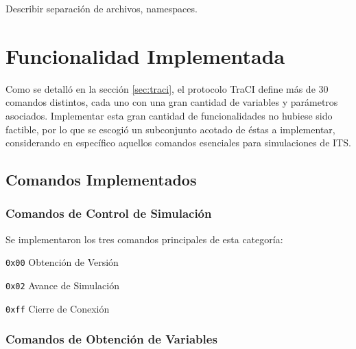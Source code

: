 Describir separación de archivos, namespaces.

\section{Funcionalidad Implementada}

Como se detalló en la sección \ref{sec:traci}, el protocolo TraCI define más de 30 comandos distintos, cada uno con una gran cantidad de variables y parámetros asociados. Implementar esta gran cantidad de funcionalidades no hubiese sido factible, por lo que se escogió un subconjunto acotado de éstas a implementar, considerando en específico aquellos comandos esenciales para simulaciones de ITS.

\subsection{Comandos Implementados}

\subsubsection{Comandos de Control de Simulación}

Se implementaron los tres comandos principales de esta categoría:
\begin{enumerate}
    \begin{multicols}{2}
        \item \texttt{0x00} Obtención de Versión
        \item \texttt{0x02} Avance de Simulación
        \item \texttt{0xff} Cierre de Conexión
    \end{multicols}
\end{enumerate}

\subsubsection{Comandos de Obtención de Variables}


